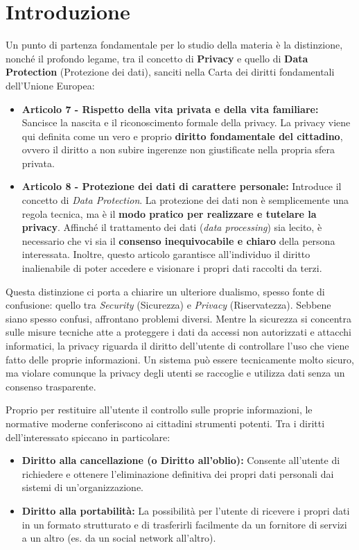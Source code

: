 \chapter*{Introduzione}

Un punto di partenza fondamentale per lo studio della materia è la distinzione, nonché il profondo legame, tra il concetto di \textbf{Privacy} e quello di \textbf{Data Protection} (Protezione dei dati), sanciti nella Carta dei diritti fondamentali dell'Unione Europea:
\begin{itemize}
    \item \textbf{Articolo 7 - Rispetto della vita privata e della vita familiare:} Sancisce la nascita e il riconoscimento formale della privacy. La privacy viene qui definita come un vero e proprio \textbf{diritto fondamentale del cittadino}, ovvero il diritto a non subire ingerenze non giustificate nella propria sfera privata.
    \item \textbf{Articolo 8 - Protezione dei dati di carattere personale:} Introduce il concetto di \textit{Data Protection}. La protezione dei dati non è semplicemente una regola tecnica, ma è il \textbf{modo pratico per realizzare e tutelare la privacy}. Affinché il trattamento dei dati (\textit{data processing}) sia lecito, è necessario che vi sia il \textbf{consenso inequivocabile e chiaro} della persona interessata. Inoltre, questo articolo garantisce all'individuo il diritto inalienabile di poter accedere e visionare i propri dati raccolti da terzi.
\end{itemize}

Questa distinzione ci porta a chiarire un ulteriore dualismo, spesso fonte di confusione: quello tra \textit{Security} (Sicurezza) e \textit{Privacy} (Riservatezza). Sebbene siano spesso confusi, affrontano problemi diversi. Mentre la sicurezza si concentra sulle misure tecniche atte a proteggere i dati da accessi non autorizzati e attacchi informatici, la privacy riguarda il diritto dell'utente di controllare l'uso che viene fatto delle proprie informazioni. Un sistema può essere tecnicamente molto sicuro, ma violare comunque la privacy degli utenti se raccoglie e utilizza dati senza un consenso trasparente.

Proprio per restituire all'utente il controllo sulle proprie informazioni, le normative moderne conferiscono ai cittadini strumenti potenti. Tra i diritti dell'interessato spiccano in particolare:
\begin{itemize}
    \item \textbf{Diritto alla cancellazione (o Diritto all'oblio):} Consente all'utente di richiedere e ottenere l'eliminazione definitiva dei propri dati personali dai sistemi di un'organizzazione.
    \item \textbf{Diritto alla portabilità:} La possibilità per l'utente di ricevere i propri dati in un formato strutturato e di trasferirli facilmente da un fornitore di servizi a un altro (es. da un social network all'altro).
\end{itemize}

